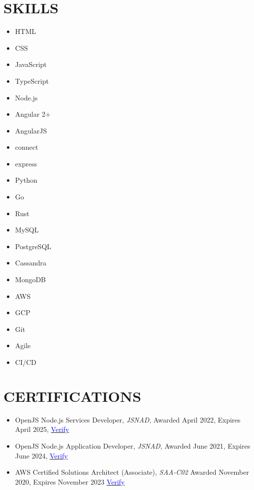 \documentclass[margin]{res}
\begin{document}
\begin{resume}
	\section{\textcolor{NavyBlue}{SKILLS}}
	\begin{multicols}{3}
		\begin{itemize}
			\item HTML
			\item CSS
			\item JavaScript
			\item TypeScript
			\item Node.js
			\item Angular 2+
			\item AngularJS
			\item connect
			\item express
			\item Python
			\item Go
			\item Rust
			\item MySQL
			\item PostgreSQL
			\item Cassandra
			\item MongoDB
			\item AWS
			\item GCP
			\item Git
			\item Agile
			\item CI/CD
		\end{itemize}
	\end{multicols}

	\section{\textcolor{NavyBlue}{CERTIFICATIONS}}
	\begin{itemize} %
		\item OpenJS Node.js Services Developer, \textit{JSNAD}, Awarded April 2022, Expires April 2025,
					\href{https://www.youracclaim.com/badges/d17570bd-2145-4cc2-9645-673fc3f6947e}{\textcolor{blue}{Verify}}

		\item OpenJS Node.js Application Developer, \textit{JSNAD}, Awarded June 2021, Expires June 2024,
		      \href{https://www.youracclaim.com/badges/76bcd62c-af5b-4957-b9ef-533403369d8d}{\textcolor{blue}{Verify}}

		\item AWS Certified Solutions Architect (Associate), \textit{SAA-C02} Awarded November 2020, Expires November 2023
		      \href{https://www.youracclaim.com/badges/4b572dd0-85e9-45f5-90f8-90a68cd3399f}{\textcolor{blue}{Verify}}


\end{itemize}
\end{resume}
\end{document}
